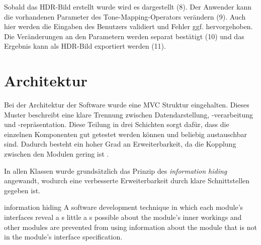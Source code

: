 Sobald das \gls{HDR}-Bild erstellt wurde wird es dargestellt (8). Der Anwender kann die vorhandenen Parameter des \gls{Tone-Mapping}-Operators verändern (9). Auch hier werden die Eingaben des Benutzers validiert und Fehler ggf. hervorgehoben. Die Veränderungen an den Parametern werden separat bestätigt (10) und das Ergebnis kann als \gls{HDR}-Bild exportiert werden (11).





\section{Architektur}
\label{sec:architektur}
Bei der Architektur der Software wurde eine \gls{MVC} Struktur eingehalten. Dieses Muster beschreibt eine klare Trennung zwischen Datendarstellung, -verarbeitung und -repräsentation. Diese Teilung in drei Schichten sorgt dafür, dass die einzelnen Komponenten gut getestet werden können und beliebig austauschbar sind. Dadurch besteht ein hoher Grad an Erweiterbarkeit, da die Kopplung zwischen den Modulen gering ist \cite[S.~413]{ludewig}.

In allen Klassen wurde grundsätzlich das Prinzip des \textit{information hiding} angewandt, wodurch eine verbesserte Erweiterbarkeit durch klare Schnittstellen gegeben ist.

\begin{ieee}{information hiding}
A software development technique in which each module's interfaces reveal a s little a s possible about the module's inner workings and other modules are prevented from using information about the module that is not in the module's interface specification.
\end{ieee}

